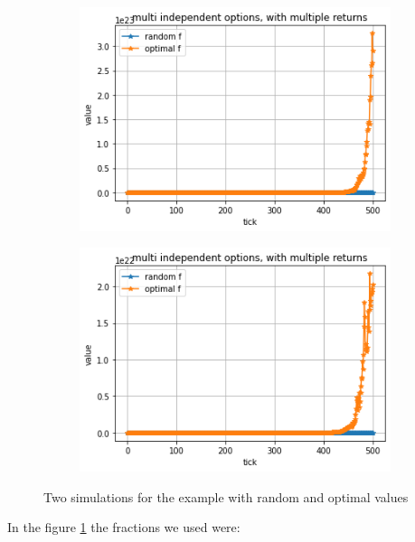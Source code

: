 \documentclass{article}
\begin{document}
		\begin{figure}[!h]
		\begin{subfigure}{0.525\textwidth}
			\includegraphics[width=0.9\linewidth]{example1} 
		\end{subfigure}
		\begin{subfigure}{0.525\textwidth}
			\includegraphics[width=0.9\linewidth]{example2}
		\end{subfigure}
		\caption{Two simulations for the example with random and optimal values}
		\label{Fig:example1}
	\end{figure}
	In the figure \ref{Fig:example1} the fractions we used were:
	
\end{document}
